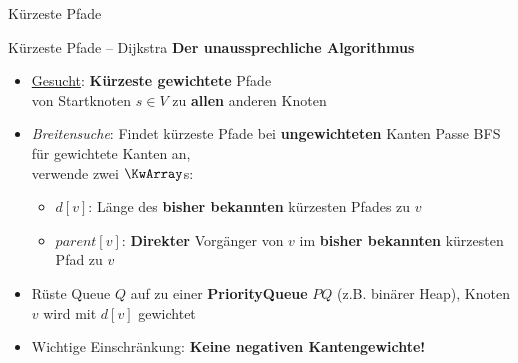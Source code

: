 



\morescalingdelimiters


	
	


\begin{headframe}
	Kürzeste Pfade
\end{headframe}
	
\begin{frame}{Kürzeste Pfade – Dijkstra}
	\textbf{Der unaussprechliche Algorithmus} 
	\begin{itemize}
		\item \underline{Gesucht}: \textbf{Kürzeste gewichtete} Pfade \\
		von Startknoten $s \in V$ zu \textbf{allen} anderen Knoten
		\pause
		\item \textit{Breitensuche}: Findet kürzeste Pfade bei \textbf{ungewichteten} Kanten
		\pause
		\implitem Passe BFS für gewichtete Kanten an, \\
		verwende zwei $\KwArray$s:
		\begin{itemize}
			\item $d[v]$: Länge des \textbf{bisher bekannten} kürzesten Pfades zu $v$ 
			\vspace{.2\baselineskip}
			\item $parent[v]$: \textbf{Direkter} Vorgänger von $v$ im \textbf{bisher bekannten} kürzesten Pfad zu $v$
		\end{itemize}
		\pause
		\item Rüste Queue $Q$ auf zu einer \textbf{PriorityQueue} $PQ$ (z.B. binärer Heap), Knoten $v$ wird mit $d[v]$ gewichtet
		\pause
		\item Wichtige Einschränkung: \textbf{Keine negativen Kantengewichte!}
	\end{itemize}
\end{frame}

